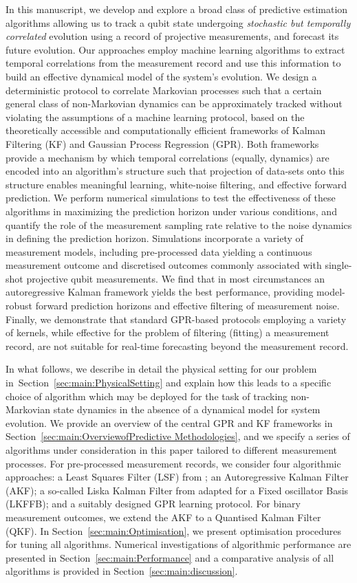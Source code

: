 In this manuscript, we develop and explore a broad class of predictive estimation algorithms allowing us to track a qubit state undergoing \emph{stochastic but temporally correlated} evolution using a record of projective measurements, and forecast its future evolution. Our approaches employ machine learning algorithms to extract temporal correlations from the measurement record and use this information to build an effective dynamical model of the system's evolution.  We design a deterministic protocol to correlate Markovian processes such that a certain general class of non-Markovian dynamics can be approximately tracked without violating the assumptions of a machine learning protocol, based on the theoretically accessible and computationally efficient frameworks of Kalman Filtering (KF) and Gaussian Process Regression (GPR).  Both frameworks provide a mechanism by which temporal correlations (equally, dynamics) are encoded into an algorithm's structure such that projection of data-sets onto this structure enables meaningful learning, white-noise filtering, and effective forward prediction.  We perform numerical simulations to test the effectiveness of these algorithms in maximizing the prediction horizon under various conditions, and quantify the role of the measurement sampling rate relative to the noise dynamics in defining the prediction horizon.  Simulations incorporate a variety of measurement models, including pre-processed data yielding a continuous measurement outcome and discretised outcomes commonly associated with single-shot projective qubit measurements.   We find that in most circumstances an autoregressive Kalman framework yields the best performance, providing model-robust forward prediction horizons and effective filtering of measurement noise.  Finally, we demonstrate that standard GPR-based protocols employing a variety of kernels, while effective for the problem of filtering (fitting) a measurement record, are not suitable for real-time forecasting beyond the measurement record.  

In what follows, we describe in detail the physical setting for our problem in~Section~\ref{sec:main:PhysicalSetting} and explain how this leads to a specific choice of algorithm which may be deployed for the task of tracking non-Markovian state dynamics in the absence of a dynamical model for system evolution.  We provide an overview of the central GPR and KF frameworks in Section~\ref{sec:main:OverviewofPredictive Methodologies}, and we specify a series of algorithms under consideration in this paper tailored to different measurement processes. For pre-processed measurement records, we consider four algorithmic approaches: a Least Squares Filter (LSF) from \cite{mavadia2017}; an Autoregressive Kalman Filter (AKF); a so-called Liska Kalman Filter from \cite{livska2007} adapted for a Fixed oscillator Basis (LKFFB); and a suitably designed GPR learning protocol. For binary measurement outcomes, we extend the AKF to a Quantised Kalman Filter (QKF). In Section~\ref{sec:main:Optimisation}, we present optimisation procedures for tuning all algorithms. Numerical investigations of algorithmic performance are presented in Section~\ref{sec:main:Performance} and a comparative analysis of all algorithms is provided in Section~\ref{sec:main:discussion}. 

